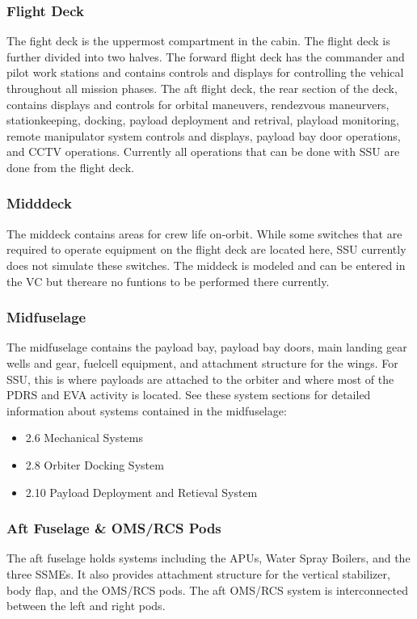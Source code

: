 \documentclass[13pt]{article}
\begin{document}
\newpage
\begin{multicols}{2}
\subsubsection{Flight Deck}
The fight deck is the uppermost compartment in the cabin.  The flight deck is further divided into two halves. The forward flight deck has the commander and pilot work stations and contains controls and displays for controlling the vehical throughout all mission phases. The aft flight deck, the rear section of the deck, contains displays and controls for orbital maneuvers, rendezvous maneurvers, stationkeeping, docking, payload deployment and retrival, playload monitoring, remote manipulator system controls and displays, payload bay door operations, and CCTV operations.  Currently all operations that can be done with SSU are done from the flight deck.

\subsubsection{Midddeck}
The middeck contains areas for crew life on-orbit.  While some switches that are required to operate equipment on the flight deck are located here, SSU currently does not simulate these switches.  The middeck is modeled and can be entered in the VC but thereare no funtions to be performed there currently.
\\

\subsubsection{Midfuselage}
The midfuselage contains the payload bay, payload bay doors, main landing gear wells and gear, fuelcell equipment, and attachment structure for the wings. For SSU, this is where payloads are attached to the orbiter and where most of the PDRS and EVA activity is located. See these system sections for detailed information about systems contained in the midfuselage: 
\begin{itemize}
\item 2.6 Mechanical Systems
\item 2.8 Orbiter Docking System
\item 2.10 Payload Deployment and Retieval System
\end{itemize}
\subsubsection{Aft Fuselage \& OMS/RCS Pods}
The aft fuselage holds systems including the APUs, Water Spray Boilers, and the three SSMEs. It also provides attachment structure for the vertical stabilizer, body flap, and the OMS/RCS pods.  The aft OMS/RCS system is interconnected between the left and right pods.
\newpage

\end{multicols}
\end{document}
